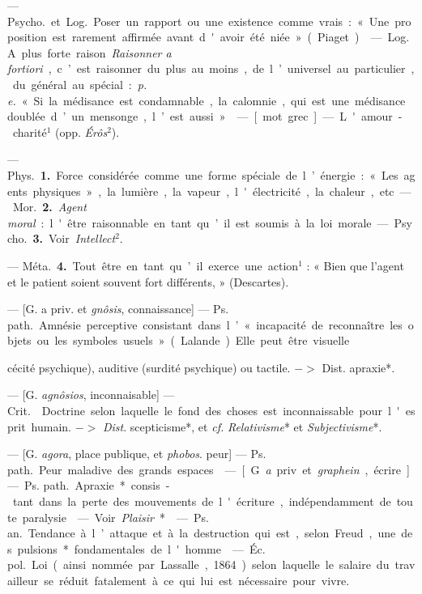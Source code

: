 \begin{itemize}[leftmargin=1cm, label=, itemsep=1pt]
 — \si{Psycho.} et \si{Log.} Poser
un rapport ou une existence comme
vrais : « Une proposition est rarement
affirmée avant d'avoir été niée »
(Piaget).

 — \si{Log.} A plus forte raison.
{\it Raisonner a fortiori}, c’est raisonner
du plus au moins, de l’universel au
particulier, du général au spécial :
{\it p. e.} « Si la médisance est condamnable,
 la calomnie, qui est une médisance
doublée d’un mensonge, l’est aussi ».

 — [mot grec] — L'amour-charité$^1$
(opp. {\it Érôs}$^2$).

 — \si{Phys.} {\bf 1.} Force considérée
comme une forme spéciale de l’énergie : « Les agents physiques », la
lumière, la vapeur, l'électricité, la
chaleur, etc.

— \si{Mor.} {\bf 2.} {\it Agent moral} : l'être
raisonnable en tant qu’il est soumis
à la loi morale.

— \si{Psycho.} {\bf 3.} Voir {\it Intellect}$^2$.

— \si{Méta.} {\bf 4.} Tout être en tant
qu’il exerce une action$^1$ : « Bien
que l'agent et le patient soient souvent fort différents, » (Descartes).

 — [G. a priv. et {\it gnôsis}, connaissance] — \si{Ps. path.} Amnésie
perceptive consistant dans l’ « incapacité de reconnaître les objets ou les
symboles usuels » (Lalande). Elle
peut être visuelle {cécité psychique),
auditive (surdité psychique) ou tactile. $->$ Dist. apraxie*.

 — [G. {\it agnôsios}, inconnaisable]
— \si{Crit.}  Doctrine selon
laquelle le fond des choses est
inconnaissable pour l'esprit humain.
$->$ {\it Dist}. scepticisme*, et {\it cf.}  {\it Relativisme}* et {\it Subjectivisme}*.

 — [G. {\it agora}, place publique,
et {\it phobos}. peur] — \si{Ps. path.} Peur
maladive des grands espaces.

 — [G. {\it a} priv. et {\it graphein},
écrire] — \si{Ps. path.} Apraxie* consis-
tant dans la perte des mouvements
de l'écriture, indépendamment de
toute paralysie.

 — Voir {\it Plaisir}*.

 — \si{Ps. an.} Tendance à
l’attaque et à la destruction qui est,
selon Freud, une des pulsions* fondamentales de l'homme.

 — \si{Éc. pol.} Loi (ainsi
nommée par Lassalle, 1864) selon
laquelle le salaire du travailleur se
réduit fatalement à ce qui lui est
nécessaire pour vivre.

}
\end{itemize}
